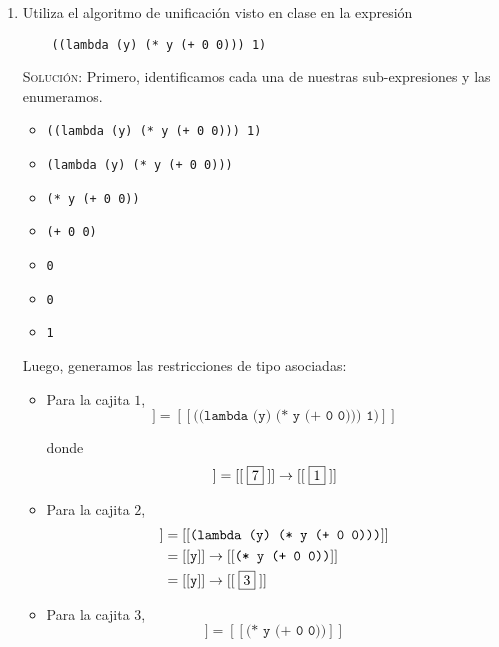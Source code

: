 \documentclass[letterpaper,11pt]{article}
\begin{document}
\begin{enumerate}
    \item Utiliza el algoritmo de unificación visto en clase en la expresión
    \begin{verbatim}
    ((lambda (y) (* y (+ 0 0))) 1)
    \end{verbatim}

    \textsc{Solución:} Primero, identificamos cada una de nuestras 
    sub-expresiones y las enumeramos.
    \begin{itemize}
        \item {} \texttt{((lambda (y) (* y (+ 0 0))) 1)}
        \item {} \texttt{(lambda (y) (* y (+ 0 0)))}
        \item {} \texttt{(* y (+ 0 0))}
        \item {} \texttt{(+ 0 0)}
        \item {} \texttt{0}
        \item {} \texttt{0}
        \item {} \texttt{1}
    \end{itemize}

    Luego, generamos las restricciones de tipo asociadas:
    \begin{itemize}
        \item Para la cajita $1$, 
        \begin{equation*}
            [[\;\fbox{1}\;]] = 
            [[\texttt{((lambda (y) (* y (+ 0 0))) 1)}]]
        \end{equation*}

        donde 
        \begin{equation*}
            [[\;\fbox{2}\;]] = [[\;\fbox{7}\;]] \rightarrow [[\;\fbox{1}\;]]
        \end{equation*}

        \item Para la cajita $2$, 
        \begin{align*}
            [[\;\fbox{2}\;]]
            &= [[\texttt{(lambda (y) (* y (+ 0 0)))}]] \\ 
            &= [[\texttt{y}]] \rightarrow [[\texttt{(* y (+ 0 0))}]] \\ 
            &= [[\texttt{y}]] \rightarrow [[\;\fbox{3}\;]]
        \end{align*}

        \item Para la cajita $3$, 
        \begin{equation*}
            [[\;\fbox{3}\;]] = [[\texttt{(* y (+ 0 0))}]]
        \end{equation*}


\end{itemize}
\end{enumerate}
\end{document}

